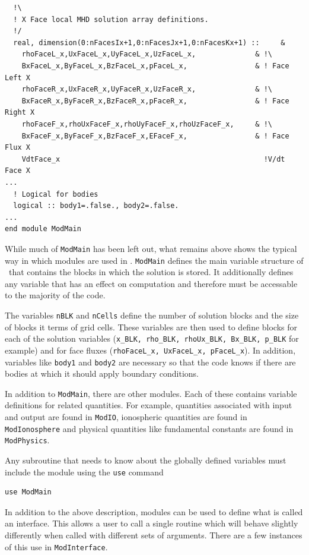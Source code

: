\begin{verbatim}
  !\
  ! X Face local MHD solution array definitions.
  !/
  real, dimension(0:nFacesIx+1,0:nFacesJx+1,0:nFacesKx+1) ::     &
    rhoFaceL_x,UxFaceL_x,UyFaceL_x,UzFaceL_x,              & !\
    BxFaceL_x,ByFaceL_x,BzFaceL_x,pFaceL_x,                & ! Face Left X
    rhoFaceR_x,UxFaceR_x,UyFaceR_x,UzFaceR_x,              & !\
    BxFaceR_x,ByFaceR_x,BzFaceR_x,pFaceR_x,                & ! Face Right X
    rhoFaceF_x,rhoUxFaceF_x,rhoUyFaceF_x,rhoUzFaceF_x,     & !\
    BxFaceF_x,ByFaceF_x,BzFaceF_x,EFaceF_x,                & ! Face Flux X
    VdtFace_x                                                !V/dt Face X
...
  ! Logical for bodies
  logical :: body1=.false., body2=.false.
...
end module ModMain
\end{verbatim}
While much of {\tt ModMain} has been left out, what remains above
shows the typical way in which modules are used in \BATSRUS.  {\tt ModMain}
defines the main variable structure of \BATSRUS\ that contains the
blocks in which the solution is stored. It additionally defines any
variable that has an effect on computation and therefore must
be accessable to the majority of the code.  

The variables {\tt nBLK} and {\tt nCells} define the number of solution
blocks and the size of blocks it terms of grid cells.  
These variables are then used to define blocks for each of
the solution variables ({\tt x\_BLK, rho\_BLK, rhoUx\_BLK, Bx\_BLK, p\_BLK} 
for example) and for face fluxes ({\tt rhoFaceL\_x, UxFaceL\_x, pFaceL\_x}).
In addition, variables like {\tt body1} and {\tt body2} are necessary so that
the code knows if there are bodies at which it should apply boundary
conditions.

In addition to {\tt ModMain}, there are other modules.  Each of these contains
variable definitions for related quantities.  For example, quantities 
associated
with input and output are found in {\tt ModIO}, ionospheric quantities are
found in {\tt ModIonosphere} and physical quantities like fundamental
constants are found in {\tt ModPhysics}.

Any subroutine that needs to know about the globally defined 
variables must include the module using the {\tt use}
command
\begin{verbatim}
use ModMain
\end{verbatim}

In addition to the above description, modules can be used to define
what is called an interface.  This allows a user to call a single 
routine which will behave slightly differently when called
with different sets of arguments.  There are a few instances of this
use in {\tt ModInterface}.

